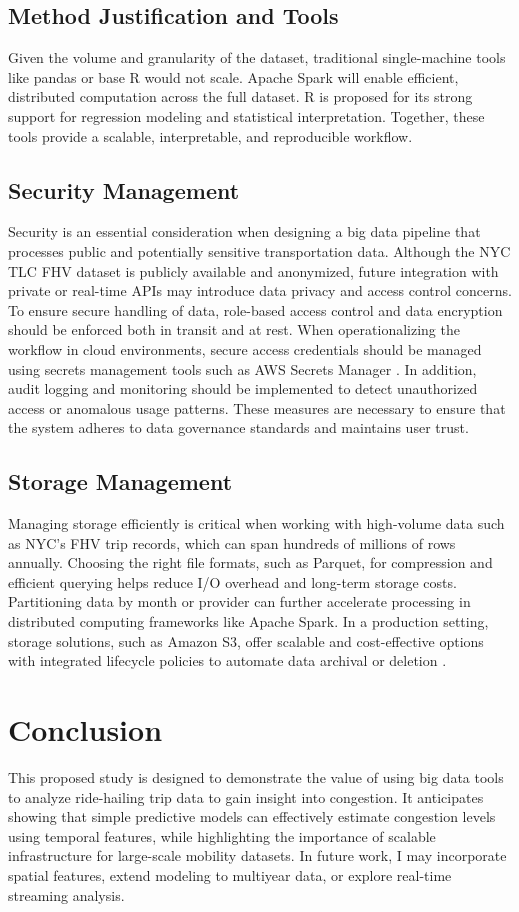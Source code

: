 \documentclass[12pt,letterpaper]{article}
\begin{document}
\subsection{Method Justification and Tools}
Given the volume and granularity of the dataset, traditional single-machine tools like pandas or base R would not scale. Apache Spark will enable efficient, distributed computation across the full dataset. R is proposed for its strong support for regression modeling and statistical interpretation. Together, these tools provide a scalable, interpretable, and reproducible workflow.

\subsection{Security Management}
Security is an essential consideration when designing a big data pipeline that processes public and potentially sensitive transportation data. Although the NYC TLC FHV dataset is publicly available and anonymized, future integration with private or real-time APIs may introduce data privacy and access control concerns. To ensure secure handling of data, role-based access control and data encryption should be enforced both in transit and at rest. When operationalizing the workflow in cloud environments, secure access credentials should be managed using secrets management tools such as AWS Secrets Manager \cite{awsSecretsManager2025}. In addition, audit logging and monitoring should be implemented to detect unauthorized access or anomalous usage patterns. These measures are necessary to ensure that the system adheres to data governance standards and maintains user trust.

\subsection{Storage Management}
Managing storage efficiently is critical when working with high-volume data such as NYC's FHV trip records, which can span hundreds of millions of rows annually. Choosing the right file formats, such as Parquet, for compression and efficient querying helps reduce I/O overhead and long-term storage costs. Partitioning data by month or provider can further accelerate processing in distributed computing frameworks like Apache Spark. In a production setting, storage solutions, such as Amazon S3, offer scalable and cost-effective options with integrated lifecycle policies to automate data archival or deletion \cite{awsS3}.

\section{Conclusion}
This proposed study is designed to demonstrate the value of using big data tools to analyze ride-hailing trip data to gain insight into congestion. It anticipates showing that simple predictive models can effectively estimate congestion levels using temporal features, while highlighting the importance of scalable infrastructure for large-scale mobility datasets. In future work, I may incorporate spatial features, extend modeling to multiyear data, or explore real-time streaming analysis.



\end{document}
